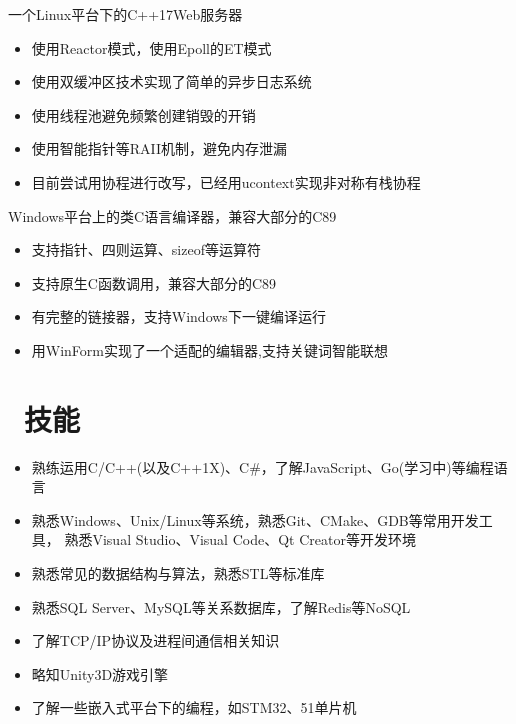 \documentclass{resume}
\begin{document}
\begin{onehalfspacing}
一个Linux平台下的C++17Web服务器
\begin{itemize}
  \item 使用Reactor模式，使用Epoll的ET模式
  \item 使用双缓冲区技术实现了简单的异步日志系统
  \item 使用线程池避免频繁创建销毁的开销
  \item 使用智能指针等RAII机制，避免内存泄漏
  \item 目前尝试用协程进行改写，已经用ucontext实现非对称有栈协程
\end{itemize}
\end{onehalfspacing}

\begin{onehalfspacing}
Windows平台上的类C语言编译器，兼容大部分的C89
\begin{itemize}
  \item 支持指针、四则运算、sizeof等运算符
  \item 支持原生C函数调用，兼容大部分的C89
  \item 有完整的链接器，支持Windows下一键编译运行
  \item 用WinForm实现了一个适配的编辑器,支持关键词智能联想
\end{itemize}
\end{onehalfspacing}



\section{\faCogs\ 技能}
\begin{itemize}[parsep=0.5ex]
  \item 熟练运用C/C++(以及C++1X)、C\#，了解JavaScript、Go(学习中)等编程语言
  \item 熟悉Windows、Unix/Linux等系统，熟悉Git、CMake、GDB等常用开发工具，
	   熟悉Visual Studio、Visual Code、Qt Creator等开发环境
  \item 熟悉常见的数据结构与算法，熟悉STL等标准库
  \item 熟悉SQL Server、MySQL等关系数据库，了解Redis等NoSQL
  \item 了解TCP/IP协议及进程间通信相关知识
  \item 略知Unity3D游戏引擎
  \item 了解一些嵌入式平台下的编程，如STM32、51单片机
\end{itemize}
\end{document}
